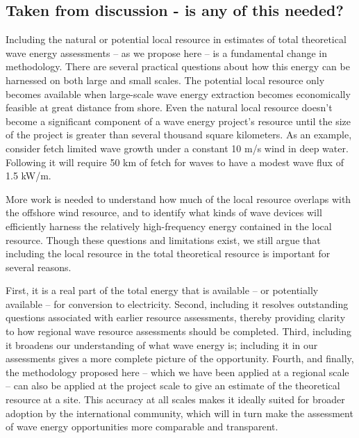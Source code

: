 \subsection{Taken from discussion - is any of this needed?}

Including the natural or potential local resource in estimates of total theoretical wave energy assessments -- as we propose here -- is a fundamental change in methodology. There are several practical questions about how this energy can be harnessed on both large and small scales. 
The potential local resource only becomes available when large-scale wave energy extraction becomes economically feasible at great distance from shore. Even the natural local resource doesn't become a significant component of a wave energy project's resource until the size of the project is greater than several thousand square kilometers. As an example, consider fetch limited wave growth under a constant 10 m/s wind in deep water. Following \citet{donelan1980similarity} it will require 50 km of fetch for waves to have a modest wave flux of 1.5 kW/m. 

More work is needed to understand how much of the local resource overlaps with the offshore wind resource, and to identify what kinds of wave devices will efficiently harness the relatively high-frequency energy contained in the local resource. Though these questions and limitations exist, we still argue that including the local resource in the total theoretical resource is important for several reasons.

First, it is a real part of the total energy that is available -- or potentially available -- for conversion to electricity. Second, including it resolves outstanding questions associated with earlier resource assessments, thereby providing clarity to how regional wave resource assessments should be completed.  Third, including it broadens our understanding of what wave energy is; including it in our assessments gives a more complete picture of the opportunity. Fourth, and finally, the methodology proposed here -- which we have been applied at a regional scale -- can also be applied at the project scale to give an estimate of the theoretical resource at a site. This accuracy at all scales makes it ideally suited for broader adoption by the international community, which will in turn make the assessment of wave energy opportunities more comparable and transparent.

